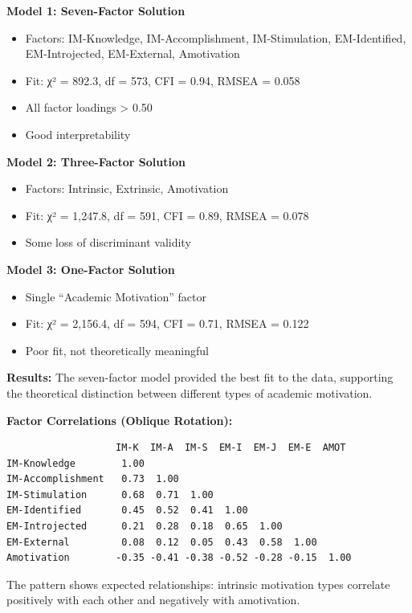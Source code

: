 \documentclass[
]{article}
\begin{document}
\textbf{Model 1: Seven-Factor Solution}

\begin{itemize}
\item
  Factors: IM-Knowledge, IM-Accomplishment, IM-Stimulation,
  EM-Identified, EM-Introjected, EM-External, Amotivation
\item
  Fit: χ² = 892.3, df = 573, CFI = 0.94, RMSEA = 0.058
\item
  All factor loadings \textgreater{} 0.50
\item
  Good interpretability
\end{itemize}

\textbf{Model 2: Three-Factor Solution}

\begin{itemize}
\item
  Factors: Intrinsic, Extrinsic, Amotivation
\item
  Fit: χ² = 1,247.8, df = 591, CFI = 0.89, RMSEA = 0.078
\item
  Some loss of discriminant validity
\end{itemize}

\textbf{Model 3: One-Factor Solution}

\begin{itemize}
\item
  Single ``Academic Motivation'' factor
\item
  Fit: χ² = 2,156.4, df = 594, CFI = 0.71, RMSEA = 0.122
\item
  Poor fit, not theoretically meaningful
\end{itemize}

\textbf{Results:} The seven-factor model provided the best fit to the
data, supporting the theoretical distinction between different types of
academic motivation.

\textbf{Factor Correlations (Oblique Rotation):}

\begin{verbatim}
                   IM-K  IM-A  IM-S  EM-I  EM-J  EM-E  AMOT
IM-Knowledge        1.00
IM-Accomplishment   0.73  1.00
IM-Stimulation      0.68  0.71  1.00
EM-Identified       0.45  0.52  0.41  1.00
EM-Introjected      0.21  0.28  0.18  0.65  1.00
EM-External         0.08  0.12  0.05  0.43  0.58  1.00
Amotivation        -0.35 -0.41 -0.38 -0.52 -0.28 -0.15  1.00
\end{verbatim}

The pattern shows expected relationships: intrinsic motivation types
correlate positively with each other and negatively with amotivation.
\end{document}
